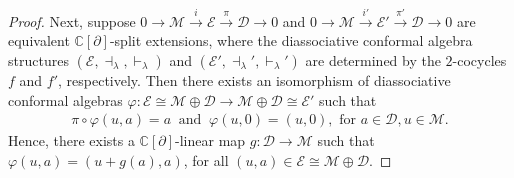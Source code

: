 \documentclass[a4paper,reqno,10pt]{amsart}
\theoremstyle{plain}
\theoremstyle{definition}
\theoremstyle{remark}
\renewcommand{\ker}{\operatorname{Ker}}
\newcommand{\C}{\mathbb{C}}
\newcommand{\D}{\mathcal{D}}
\newcommand{\M}{\mathcal{M}}
\newcommand{\E}{\mathcal{E}}
\newcommand{\p}{\partial}
\newcommand{\la}{\lambda}
\begin{document}
\begin{proof}
Next, suppose $0\longrightarrow
\M
\xrightarrow{\ i \ }
\E
\xrightarrow{\ \pi\ }
\D
\longrightarrow 0$ and $0\longrightarrow
\M
\xrightarrow{\ i' \ }
\E'
\xrightarrow{\ \pi' \ }
\D
\longrightarrow 0$
are equivalent $\C[\partial]$-split extensions, where the diassociative conformal algebra structures $(\E, \dashv_{\la}, \vdash_{\la})$ and $(\E', \dashv_{\la}',\vdash_{\la}')$ are determined by the $2$-cocycles $f$ and $f'$, respectively. Then there exists an isomorphism of diassociative conformal algebras $\varphi : \E \cong \M \oplus \D \longrightarrow \M \oplus \D \cong \E'$ such that 
\begin{align}
\pi\circ \varphi (u, a)= a ~ \text{ and } ~
\varphi (u,0)=(u,0),  \text{ for } a \in \D,  u \in \M.  \label{eq4}
\end{align}
Hence, there exists a $\C [\partial]$-linear map $g : \D \longrightarrow \M$ such that $\varphi (u, a) = (u + g (a), a)$, for all $(u, a) \in \E \cong \M \oplus \D$.

\end{proof}
\end{document}
